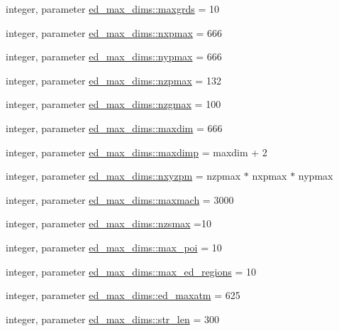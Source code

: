 \begin{DoxyCompactItemize}
\item 
integer, parameter \hyperlink{namespaceed__max__dims_a76506f11ab040bb342f7eeeda2609717}{ed\+\_\+max\+\_\+dims\+::maxgrds} = 10
\item 
integer, parameter \hyperlink{namespaceed__max__dims_a916d08772a2cdff90b033432f7c043dd}{ed\+\_\+max\+\_\+dims\+::nxpmax} = 666
\item 
integer, parameter \hyperlink{namespaceed__max__dims_a70351cc508b47a5bfa506ba83bf41523}{ed\+\_\+max\+\_\+dims\+::nypmax} = 666
\item 
integer, parameter \hyperlink{namespaceed__max__dims_af7442061eb579be9e9fa573af2fae0d0}{ed\+\_\+max\+\_\+dims\+::nzpmax} = 132
\item 
integer, parameter \hyperlink{namespaceed__max__dims_ab4473c9ce607be530183213a2b990ba5}{ed\+\_\+max\+\_\+dims\+::nzgmax} = 100
\item 
integer, parameter \hyperlink{namespaceed__max__dims_a9939d6b90ae112d873f844ddf07a6544}{ed\+\_\+max\+\_\+dims\+::maxdim} = 666
\item 
integer, parameter \hyperlink{namespaceed__max__dims_a203a83a4c06e8a68f13e469a976083d4}{ed\+\_\+max\+\_\+dims\+::maxdimp} = maxdim + 2
\item 
integer, parameter \hyperlink{namespaceed__max__dims_a1a2dbf06e020c31e81f4f1b3537e7111}{ed\+\_\+max\+\_\+dims\+::nxyzpm} = nzpmax $\ast$ nxpmax $\ast$ nypmax
\item 
integer, parameter \hyperlink{namespaceed__max__dims_a499b4b6352c44f2e900d47d4a1c96bb9}{ed\+\_\+max\+\_\+dims\+::maxmach} = 3000
\item 
integer, parameter \hyperlink{namespaceed__max__dims_a9ae5c1b79b953a335b3038d4fd3b206b}{ed\+\_\+max\+\_\+dims\+::nzsmax} =10
\item 
integer, parameter \hyperlink{namespaceed__max__dims_a4a66ae8729df41bb66a806d56f685ada}{ed\+\_\+max\+\_\+dims\+::max\+\_\+poi} = 10
\item 
integer, parameter \hyperlink{namespaceed__max__dims_a046576e3650edec35f14647030a0ad7e}{ed\+\_\+max\+\_\+dims\+::max\+\_\+ed\+\_\+regions} = 10
\item 
integer, parameter \hyperlink{namespaceed__max__dims_a9546595c14761003135ceaea096141e0}{ed\+\_\+max\+\_\+dims\+::ed\+\_\+maxatm} = 625
\item 
integer, parameter \hyperlink{namespaceed__max__dims_a2d9d6df2bb657ed6455ccdf411863dd9}{ed\+\_\+max\+\_\+dims\+::str\+\_\+len} = 300
\item 

\end{DoxyCompactItemize}
